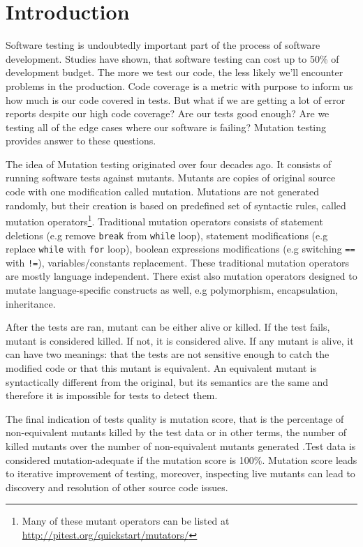 \documentclass[
  digital, %
  table,   %
  lof,     %
  lot,     %
]{fithesis3}
\begin{document}
\chapter{Introduction}
Software testing is undoubtedly important part of the process of software development. Studies have shown, that software testing can cost up to 50\% of development budget.  The more we test our code, the less likely we'll encounter problems in the production. Code coverage is a metric with purpose to inform us how much is our code covered in tests. But what if we are getting a lot of error reports despite our high code coverage? Are our tests good enough? Are we testing all of the edge cases where our software is failing? Mutation testing provides answer to these questions.  
\par The idea of Mutation testing originated over four decades ago.
It consists of running software tests against mutants. Mutants are copies of original source code with one modification called mutation. Mutations are not generated randomly, but their creation is based on predefined set of syntactic rules, called mutation operators\footnote{Many of these mutant operators can be listed at \url{http://pitest.org/quickstart/mutators/}}. Traditional mutation operators consists of statement deletions (e.g remove \texttt{break} from \texttt{while} loop), statement modifications (e.g replace \texttt{while} with \texttt{for} loop), boolean expressions modifications (e.g switching \texttt{==} with \texttt{!=}), variables/constants replacement. These traditional mutation operators are mostly language independent. There exist also mutation operators designed to mutate language-specific constructs as well, e.g polymorphism, encapsulation, inheritance.
\par After the tests are ran, mutant can be either alive or killed. If the test fails, mutant is considered killed. If not, it is considered alive. If any mutant is alive, it can have two meanings: that the tests are not sensitive enough to catch the modified code or that this mutant is equivalent. An equivalent mutant is syntactically different from the original, but its semantics are the same and therefore it is impossible for tests to detect them. \par The final indication of tests quality is mutation score, that is the percentage of non-equivalent mutants killed by the test data or in other terms, the number of killed mutants over the number of non-equivalent mutants generated .Test data is considered mutation-adequate if the mutation score is 100\%. Mutation score leads to iterative improvement of testing, moreover, inspecting live mutants can lead to discovery and resolution of other source code issues.
\end{document}
